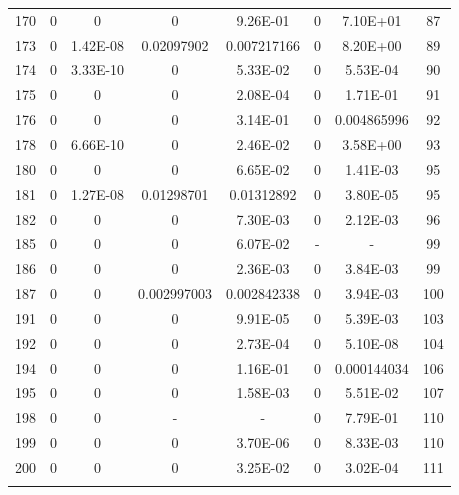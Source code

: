 {\begin{longtable}{cccccccc}
170 & {\color{red}0} & {\color{red}0} & {\color{red}0} & 9.26E-01 & {\color{red}0} & 7.10E+01 & 87 \\
173 & {\color{red}0} & {\color{red}1.42E-08} & {\color{red}0.02097902} & {\color{red}0.007217166} & {\color{red}0} & 8.20E+00 & 89 \\
174 & {\color{red}0} & {\color{red}3.33E-10} & {\color{red}0} & 5.33E-02 & {\color{red}0} & {\color{red}5.53E-04} & 90 \\
175 & {\color{red}0} & {\color{red}0} & {\color{red}0} & {\color{red}2.08E-04} & {\color{red}0} & 1.71E-01 & 91 \\
176 & {\color{red}0} & {\color{red}0} & {\color{red}0} & 3.14E-01 & {\color{red}0} & {\color{red}0.004865996} & 92 \\
178 & {\color{red}0} & {\color{red}6.66E-10} & {\color{red}0} & {\color{red}2.46E-02} & {\color{red}0} & 3.58E+00 & 93 \\
180 & {\color{red}0} & {\color{red}0} & {\color{red}0} & 6.65E-02 & {\color{red}0} & {\color{red}1.41E-03} & 95 \\
181 & {\color{red}0} & {\color{red}1.27E-08} & {\color{red}0.01298701} & {\color{red}0.01312892} & {\color{red}0} & {\color{red}3.80E-05} & 95 \\
182 & {\color{red}0} & {\color{red}0} & {\color{red}0} & {\color{red}7.30E-03} & {\color{red}0} & {\color{red}2.12E-03} & 96 \\
185 & {\color{red}0} & {\color{red}0} & {\color{red}0} & 6.07E-02 & - & - & 99 \\
186 & {\color{red}0} & {\color{red}0} & {\color{red}0} & {\color{red}2.36E-03} & {\color{red}0} & {\color{red}3.84E-03} & 99 \\
187 & {\color{red}0} & {\color{red}0} & {\color{red}0.002997003} & {\color{red}0.002842338} & {\color{red}0} & {\color{red}3.94E-03} & 100 \\
191 & {\color{red}0} & {\color{red}0} & {\color{red}0} & {\color{red}9.91E-05} & {\color{red}0} & {\color{red}5.39E-03} & 103 \\
192 & {\color{red}0} & {\color{red}0} & {\color{red}0} & {\color{red}2.73E-04} & {\color{red}0} & {\color{red}5.10E-08} & 104 \\
194 & {\color{red}0} & {\color{red}0} & {\color{red}0} & 1.16E-01 & {\color{red}0} & {\color{red}0.000144034} & 106 \\
195 & {\color{red}0} & {\color{red}0} & {\color{red}0} & {\color{red}1.58E-03} & {\color{red}0} & {\color{red}5.51E-02} & 107 \\
198 & {\color{red}0} & {\color{red}0} & - & - & {\color{red}0} & 7.79E-01 & 110 \\
199 & {\color{red}0} & {\color{red}0} & {\color{red}0} & {\color{red}3.70E-06} & {\color{red}0} & {\color{red}8.33E-03} & 110 \\
200 & {\color{red}0} & {\color{red}0} & {\color{red}0} & {\color{red}3.25E-02} & {\color{red}0} & {\color{red}3.02E-04} & 111 \\ \hline       
\label{tab:sorirotation1}
\end{longtable}
}

